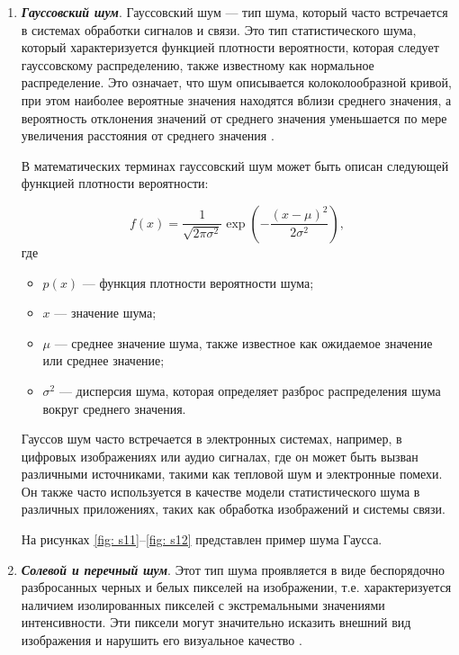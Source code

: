 \begin{enumerate}
    \item \textit{\textbf{Гауссовский шум}}. Гауссовский шум --- тип шума, который часто встречается в системах обработки сигналов и связи. Это тип статистического шума, который характеризуется функцией плотности вероятности, которая следует гауссовскому распределению, также известному как нормальное распределение. Это означает, что шум описывается колоколообразной кривой, при этом наиболее вероятные значения находятся вблизи среднего значения, а вероятность отклонения значений от среднего значения уменьшается по мере увеличения расстояния от среднего значения \cite{noisetypes}.

    В математических терминах гауссовский шум может быть описан следующей функцией плотности вероятности:

    \begin{equation}
        f(x) = \frac{1}{\sqrt{2 \pi \sigma^2}} \exp \left( -\frac{(x - \mu)^2}{2 \sigma^2} \right),
    \end{equation}
    где
    \begin{itemize}
        \item $p(x)$ --- функция плотности вероятности шума;
        \item $x$ --- значение шума;
        \item $\mu$ --- среднее значение шума, также известное как ожидаемое значение или среднее значение;
        \item $\sigma^2$ --- дисперсия шума, которая определяет разброс распределения шума вокруг среднего значения.
    \end{itemize}
    
    Гауссов шум часто встречается в электронных системах, например, в цифровых изображениях или аудио сигналах, где он может быть вызван различными источниками, такими как тепловой шум и электронные помехи. Он также часто используется в качестве модели статистического шума в различных приложениях, таких как обработка изображений и системы связи.

    На рисунках \ref{fig: s11}--\ref{fig: s12} представлен пример шума Гаусса.


    \item \textit{\textbf{Солевой и перечный шум}}. Этот тип шума проявляется в виде беспорядочно разбросанных черных и белых пикселей на изображении, т.е. характеризуется наличием изолированных пикселей с экстремальными значениями интенсивности. Эти пиксели могут значительно исказить внешний вид изображения и нарушить его визуальное качество \cite{noisetypes}.


\end{enumerate}
